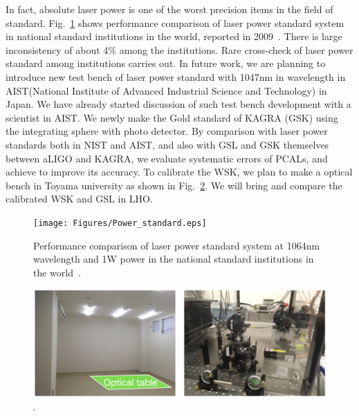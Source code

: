 In fact, absolute laser power is one of the worst precision items in the field of standard. Fig.~\ref{fig:Power_standard} shows performance comparison of laser power standard system in national standard institutions in the world, reported in 2009~\cite{EUROMET}. There is large inconsistency of about 4\% among the institutions. Rare cross-check of laser power standard among institutions carries out. In future work, we are planning to introduce new test bench of laser power standard with 1047nm in wavelength in AIST(National Institute of Advanced Industrial Science and Technology)  in Japan. We have already started discussion of such test bench development with a scientist in AIST. We newly make the Gold standard of KAGRA (GSK) using the integrating sphere with photo detector. By comparison with laser power standards both in NIST and AIST, and also with GSL and GSK themselves between aLIGO and KAGRA, we evaluate systematic errors of PCALs, and achieve to improve its accuracy. To calibrate the WSK, we plan to make a optical bench in Toyama university as shown in Fig.~\ref{fig:Toyama}. We will bring and compare the calibrated WSK and GSL in LHO.

\begin{figure}
\begin{center}
\texttt{[image: Figures/Power\_standard.eps]}
\caption{
Performance comparison of laser power standard system at 1064nm wavelength and 1W power in the national standard institutions in the world~\cite{EUROMET}.
} 
\label{fig:Power_standard} 
\end{center}
\end{figure}

\begin{figure}
\begin{center}
\includegraphics[width=14cm]{Figures/Toyama.eps}
\caption{.} 
\label{fig:Toyama} 
\end{center}
\end{figure}
